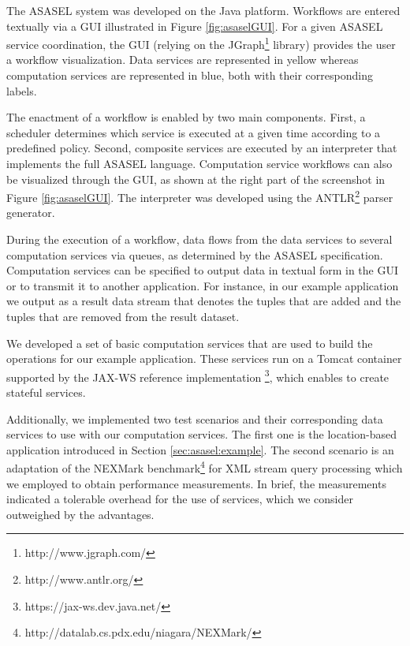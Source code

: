 \documentclass{acm_proc_article-sp}
\begin{document}
The ASASEL system was developed on the Java platform. Workflows are entered textually via a GUI illustrated in Figure \ref{fig:asaselGUI}. For a given ASASEL service coordination, the GUI (relying on the JGraph\footnote{http://www.jgraph.com/} library) provides the user a workflow visualization. Data services are represented in yellow whereas computation services are represented in blue, both with their corresponding labels.

The enactment of a workflow is enabled by two main components. First, a scheduler determines which service is executed at a given time according to a predefined policy. Second, composite services are executed by an interpreter that implements the full ASASEL language. Computation service workflows can also be visualized through the GUI, as shown at the right part of the screenshot in Figure \ref{fig:asaselGUI}. The interpreter was developed using the ANTLR\footnote{http://www.antlr.org/} parser generator.
	
During the execution of a workflow, data flows from the data services to several computation services via queues, as determined by the ASASEL specification. Computation services can be specified to output data in textual form in the GUI or to transmit it to another application. For instance, in our example application we output as a result data stream that denotes the tuples that are added and the tuples that are removed from the result dataset.
	
We developed a set of basic computation services that are used to build the operations for our example application. These services run on a Tomcat container supported by the JAX-WS reference implementation \footnote{https://jax-ws.dev.java.net/}, which enables to create stateful services.
	
Additionally, we implemented two test scenarios and their corresponding data services to use with our computation services. The first one is the location-based application introduced in Section \ref{sec:asasel:example}. The second scenario is an adaptation of the NEXMark benchmark\footnote{http://datalab.cs.pdx.edu/niagara/NEXMark/} for XML stream query processing which we employed to obtain performance measurements. In brief, the measurements indicated a tolerable overhead for the use of services, which we consider outweighed by the advantages.
	
	
\end{document}
